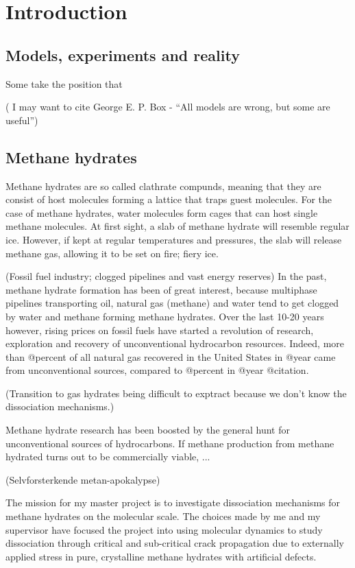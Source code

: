 \chapter{Introduction}
\section{Models, experiments and reality}
Some take the position that 

( I may want to cite George E. P. Box - ``All models are wrong, but some are useful'')

\section{Methane hydrates}
Methane hydrates are so called clathrate compunds, meaning that they are consist of host molecules forming a lattice that traps guest molecules. For the case of methane hydrates, water molecules form cages that can host single methane molecules. At first sight, a slab of methane hydrate will resemble regular ice. However, if kept at regular temperatures and pressures, the slab will release methane gas, allowing it to be set on fire; fiery ice. 

(Fossil fuel industry; clogged pipelines and vast energy reserves)
In the past, methane hydrate formation has been of great interest, because multiphase pipelines transporting oil, natural gas (methane) and water tend to get clogged by water and methane forming methane hydrates. Over the last 10-20 years however, rising prices on fossil fuels have started a revolution of research, exploration and recovery of unconventional hydrocarbon resources. Indeed, more than @percent of all natural gas recovered in the United States in @year came from unconventional sources, compared to @percent in @year @citation. 

(Transition to gas hydrates being difficult to exptract because we don't know the dissociation mechanisms.)

Methane hydrate research has been boosted by the general hunt for unconventional sources of hydrocarbons. If methane production from methane hydrated turns out to be commercially viable, ...

(Selvforsterkende metan-apokalypse)

The mission for my master project is to investigate dissociation mechanisms for methane hydrates on the molecular scale. The choices made by me and my supervisor have focused the project into using molecular dynamics to study dissociation through critical and sub-critical crack propagation due to externally applied stress in pure, crystalline methane hydrates with artificial defects. 


